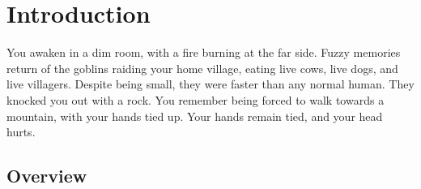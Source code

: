 \chapter{Introduction}

\epigraph{

  You awaken in a dim room, with a fire burning at the far side.
  Fuzzy memories return of the goblins raiding your home village, eating live cows, live dogs, and live villagers.
  Despite being small, they were faster than any normal human.
  They knocked you out with a rock.
  You remember being forced to walk towards a mountain, with your hands tied up.
  Your hands remain tied, and your head hurts.
}{}

\section{Overview}

